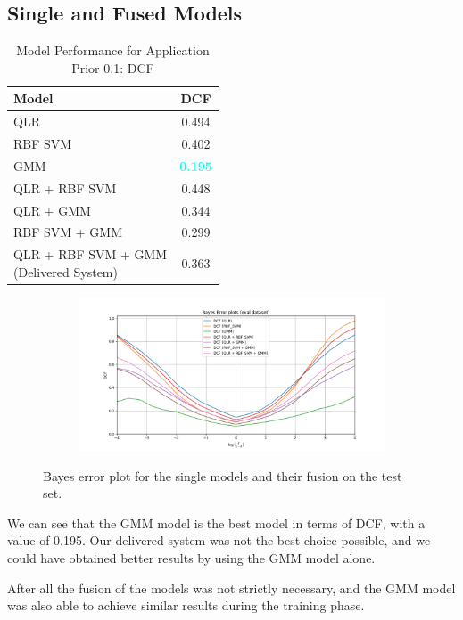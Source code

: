 \documentclass[12pt]{report}
\newcommand{\nl}{%
    \newline
    \noindent
}
\begin{document}
\subsection*{Single and Fused Models}
\begin{table}[H]
    \centering
    \begin{tabular}{|l|c|}
        \hline
        \rowcolor{blue!10}
        \textbf{Model} & \textbf{DCF}                     \\
        \hline
        QLR            & 0.494                            \\
        \hline
        RBF SVM        & 0.402                            \\
        \hline
        GMM            & \textcolor{cyan}{\textbf{0.195}} \\
        \hline
        QLR + RBF SVM  & 0.448                            \\
        \hline
        QLR + GMM      & 0.344                            \\
        \hline
        RBF SVM + GMM  & 0.299                            \\
        \hline
        \makecell{QLR + RBF SVM + GMM                     \\ (Delivered System)} & 0.363                            \\
        \hline
    \end{tabular}
    \caption{Model Performance for Application Prior 0.1: DCF}
    \label{tab:model_performance}
\end{table}

\begin{figure}[H]
    \centering
    \begin{subfigure}[t]{0.6\textwidth}
        \includegraphics[width=\textwidth]{./plot/eval/DCF_eval.png}
    \end{subfigure}
    \caption{Bayes error plot for the single models and their fusion on the test set.}
    \label{fig:DCF_eval}
\end{figure}
\noindent
We can see that the GMM model is the best model in terms of DCF, with a value of 0.195. Our delivered system was not the best choice possible, and we could have obtained better results by using the GMM model alone.
\nl
After all the fusion of the models was not strictly necessary, and the GMM model was also able to achieve similar results during the training phase.
\end{document}
